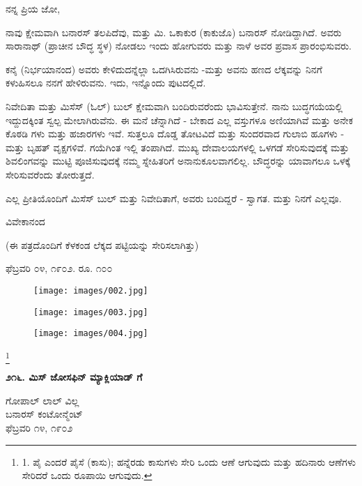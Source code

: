 ನನ್ನ ಪ್ರಿಯ ಜೋ,

ನಾವು ಕ್ಷೇಮವಾಗಿ ಬನಾರಸ್ ತಲಪಿದೆವು, ಮತ್ತು ಮಿ. ಒಕಾಕುರ (ಕಾಕುಜೊ) ಬನಾರಸ್ ನೋಡಿದ್ದಾಗಿದೆ. ಅವರು ಸಾರಾನಾಥ್ (ಪ್ರಾಚೀನ ಬೌದ್ಧ ಸ್ಥಳ) ನೋಡಲು ಇಂದು ಹೋಗುವರು ಮತ್ತು ನಾಳೆ ಅವರ ಪ್ರವಾಸ ಪ್ರಾರಂಭಿಸುವರು.

ಕನೈ (ನಿರ್ಭಯಾನಂದ) ಅವರು ಕೇಳಿದುದನ್ನೆಲ್ಲಾ ಒದಗಿಸಿರುವನು -ಮತ್ತು ಅವನು ಹಣದ ಲೆಕ್ಕವನ್ನು ನಿನಗೆ ಕಳುಹಿಸಲೂ ನನಗೆ ಹೇಳಿರುವನು. ಇದು, ಇನ್ನೊಂದು ಪುಟದಲ್ಲಿದೆ.

ನಿವೇದಿತಾ ಮತ್ತು ಮಿಸೆಸ್ (ಓಲ್) ಬುಲ್ ಕ್ಷೇಮವಾಗಿ ಬಂದಿರುವರೆಂದು ಭಾವಿಸುತ್ತೇನೆ. ನಾನು ಬುದ್ಧಗಯೆಯಲ್ಲಿ ಇದ್ದುದಕ್ಕಿಂತ ಸ್ವಲ್ಪ ಮೇಲಾಗಿರುವೆನು. ಈ ಮನೆ ಚೆನ್ನಾಗಿದೆ - ಬೇಕಾದ ಎಲ್ಲ ವಸ್ತುಗಳೂ ಅಣಿಯಾಗಿವೆ ಮತ್ತು ಅನೇಕ ಕೊಠಡಿ ಗಳು ಮತ್ತು ಹಜಾರಗಳು ಇವೆ. ಸುತ್ತಲೂ ದೊಡ್ಡ ತೋಟವಿದೆ ಮತ್ತು ಸುಂದರವಾದ ಗುಲಾಬಿ ಹೂಗಳು - ಮತ್ತು ಬೃಹತ್ ವೃಕ್ಷಗಳಿವೆ. ಗಯೆಗಿಂತ ಇಲ್ಲಿ ತಂಪಾಗಿದೆ. ಮುಖ್ಯ ದೇವಾಲಯಗಳಲ್ಲಿ ಒಳಗಡೆ ಸೇರಿಸುವುದಕ್ಕೆ ಮತ್ತು ಶಿವಲಿಂಗವನ್ನು ಮುಟ್ಟಿ ಪೂಜಿಸುವುದಕ್ಕೆ ನಮ್ಮ ಸ್ನೇಹಿತರಿಗೆ ಅನಾನುಕೂಲವಾಗಲಿಲ್ಲ. ಬೌದ್ಧರನ್ನು ಯಾವಾಗಲೂ ಒಳಕ್ಕೆ ಸೇರಿಸುವರೆಂದು ತೋರುತ್ತದೆ.

ಎಲ್ಲ ಪ್ರೀತಿಯೊಂದಿಗೆ ಮಿಸೆಸ್ ಬುಲ್ ಮತ್ತು ನಿವೇದಿತಾಗೆ, ಅವರು ಬಂದಿದ್ದರೆ - ಸ್ವಾಗತ. ಮತ್ತು ನಿನಗೆ ಎಲ್ಲವೂ.

\begin{flushright}
ವಿವೇಕಾನಂದ
\end{flushright}

(ಈ ಪತ್ರದೊಂದಿಗೆ ಕೆಳಕಂಡ ಲೆಕ್ಕದ ಪಟ್ಟಿಯನ್ನು ಸೇರಿಸಲಾಗಿತ್ತು)

ಫೆಬ್ರವರಿ ೦೪, ೧೯೦೨. ರೂ. ೧೦೦

\begin{figure}
\texttt{[image: images/002.jpg]}
\end{figure}


\begin{figure}
\texttt{[image: images/003.jpg]}
\end{figure}


\begin{figure}
\texttt{[image: images/004.jpg]}
\end{figure}

\footnote{1. ಪೈ ಎಂದರೆ ಪೈಸೆ (ಕಾಸು); ಹನ್ನೆರಡು ಕಾಸುಗಳು ಸೇರಿ ಒಂದು ಆಣೆ ಆಗುವುದು ಮತ್ತು ಹದಿನಾರು ಆಣೆಗಳು ಸೇರಿದರೆ ಒಂದು ರೂಪಾಯಿ ಆಗುವುದು.}

\begin{center}
\textbf{೨೧೬. ಮಿಸ್ ಜೋಸಫಿನ್ ಮ್ಯಾಕ್ಲಿಯಾಡ್ ಗೆ}
\end{center}

\begin{flushright}
ಗೋಪಾಲ್ ಲಾಲ್ ವಿಲ್ಲ\\ಬನಾರಸ್ ಕಂಟೋನ್ಮೆಂಟ್\\ಫೆಬ್ರವರಿ ೧೪, ೧೯೦೨
\end{flushright}

